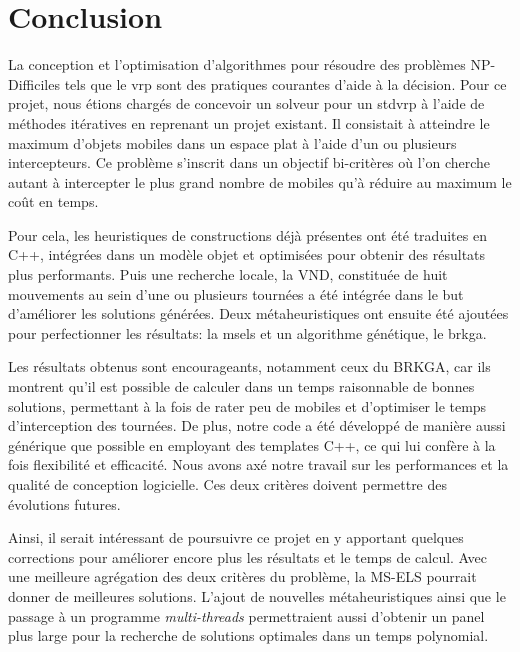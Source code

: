 \chapter*{Conclusion}

La conception et l'optimisation d'algorithmes pour résoudre des problèmes NP-Difficiles tels que le \acrlong{vrp} sont des pratiques courantes d'aide à la décision. Pour ce projet, nous étions chargés de concevoir un solveur pour un \acrlong{stdvrp} à l'aide de méthodes itératives en reprenant un projet existant. Il consistait à atteindre le maximum d'objets mobiles dans un espace plat à l'aide d'un ou plusieurs intercepteurs. Ce problème s'inscrit dans un objectif bi-critères où l'on cherche autant à intercepter le plus grand nombre de mobiles qu'à réduire au maximum le coût en temps.

Pour cela, les heuristiques de constructions déjà présentes ont été traduites en C++, intégrées dans un modèle objet et optimisées pour obtenir des résultats plus performants. Puis une recherche locale, la VND, constituée de huit mouvements au sein d'une ou plusieurs tournées a été intégrée dans le but d'améliorer les solutions générées. Deux métaheuristiques ont ensuite été ajoutées pour perfectionner les résultats: la \acrlong{msels} et un algorithme génétique, le \acrlong{brkga}.

Les résultats obtenus sont encourageants, notamment ceux du BRKGA, car ils montrent qu'il est possible de calculer dans un temps raisonnable de bonnes solutions, permettant à la fois de rater peu de mobiles et d'optimiser le temps d'interception des tournées. De plus, notre code a été développé de manière aussi générique que possible en employant des templates C++, ce qui lui confère à la fois flexibilité et efficacité. Nous avons axé notre travail sur les performances et la qualité de conception logicielle. Ces deux critères doivent permettre des évolutions futures.

Ainsi, il serait intéressant de poursuivre ce projet en y apportant quelques corrections pour améliorer encore plus les résultats et le temps de calcul. Avec une meilleure agrégation des deux critères du problème, la MS-ELS pourrait donner de meilleures solutions. L'ajout de nouvelles métaheuristiques ainsi que le passage à un programme \emph{multi-threads} permettraient aussi d'obtenir un panel plus large pour la recherche de solutions optimales dans un temps polynomial.

